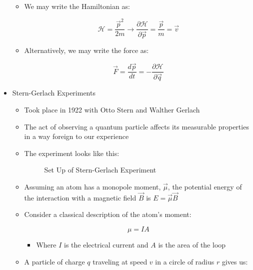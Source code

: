 \begin{itemize}
\begin{itemize}
      \item We may write the Hamiltonian as:

        $$\mathcal{H}=\frac{\vec{p}^2}{2m}\longrightarrow \frac{\partial \mathcal{H}}{\partial \vec{p}}=\frac{\vec{p}}{m}=\vec{v}$$

      \item Alternatively, we may write the force as:

        $$\vec{F}=\frac{d\vec{p}}{dt}=-\frac{\partial \mathcal{H}}{\partial\vec{q}}$$

    \end{itemize}

  \item Stern-Gerlach Experiments

    \begin{itemize}
        
      \item Took place in 1922 with Otto Stern and Walther Gerlach

      \item The act of observing a quantum particle affects its measurable properties in a way foreign to our experience

      \item The experiment looks like this:

        \begin{figure}[H]
          \centering
          
          \caption{Set Up of Stern-Gerlach Experiment}
          \label{fig:1}
        \end{figure}

      \item Assuming an atom has a monopole moment, $\vec{\mu}$, the potential energy of the interaction with a magnetic field $\vec{B}$ is $E=\vec{\mu}\vec{B}$

      \item Consider a classical description of the atom's moment:

        $$\mu=IA$$

        \begin{itemize}

          \item Where $I$ is the electrical current and $A$ is the area of the loop

        \end{itemize}

      \item A particle of charge $q$ traveling at speed $v$ in a circle of radius $r$ gives us:


\end{itemize}
\end{itemize}
